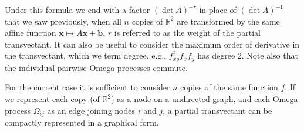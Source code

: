 \documentclass[review,onefignum,onetabnum]{siamonline190516}
\begin{document}
Under this formula we end with a factor $(\det A)^{-r}$ in place of $(\det
A)^{-1}$ that we saw previously, when all $n$ copies of $\mathbb{R}^2$ are
transformed by the same affine function $\mathbf{x} \mapsto A\mathbf{x} +
\mathbf{b}$. $r$ is referred to as the weight of the partial
transvectant. It can also be useful to consider the maximum order of
derivative in the transvectant, which we term degree, e.g., $f_{xy}^2 f_x
f_y$ has degree 2. Note also that the individual pairwise Omega processes commute.

For the current case it is sufficient to consider $n$ copies of the same
function $f$. If we represent each copy (of $\mathbb{R}^2$) as a node on a
undirected graph, and each Omega process $\Omega_{ij}$ as an edge joining
nodes $i$ and $j$, a partial transvectant can be compactly represented in a
graphical form. 
\end{document}
